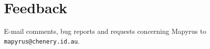 
\section{Feedback}

E-mail comments, bug reports and requests concerning Mapyrus to
\texttt{mapyrus@chenery.id.au}.

